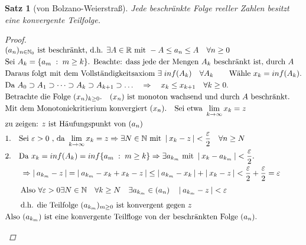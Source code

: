 \documentclass[a4paper,titlepage,oneside]{article}
\def\N{\ensuremath{\mathbb{N}} }
\def\R{\ensuremath{\mathbb{R}} }
\renewcommand{\epsilon}{\ensuremath{\varepsilon} }
\def\zz{\text{zu zeigen: }}
\def\sp{\hspace{0,1cm}}
\renewcommand{\liminf}[2][n]{\ensuremath{\lim\limits_{#1 \rightarrow \infty}{#2}}}
\newcommand{\abs}[1]{\ensuremath{\left|\:#1\:\right|}}
\newcommand{\menge}[2]{\ensuremath{\{#1\sp : \sp #2\}}}
\theoremstyle{thmstyle}
\newtheorem{satz}{Satz}[subsection]
\begin{document}
\begin{satz}[von Bolzano-Weierstraß]
Jede beschränkte Folge reeller Zahlen besitzt eine konvergente Teilfolge.
\begin{proof}
\begin{math} \displaystyle
\begin{aligned}[t]
&(a_n)_{n \in \N_0} \text{ ist beschränkt, d.h. }\exists A \in \R \text{ mit }-A \le a_n \le A \quad \forall n \ge 0\\
&\text{Sei } A_k = \menge{a_m}{m \ge k} \text{. Beachte: dass jede der Mengen } A_k \text{ beschränkt ist, durch }A\\
&\text{Daraus folgt mit dem Vollständigkeitsaxiom } \exists \sp inf(A_k) \quad \forall A_k \qquad \text{Wähle } x_k = inf(A_k). \\
&\text{Da } A_0 \supset A_1 \supset \dots \supset A_k \supset A_{k+1} \supset \dots \quad \Rightarrow \quad x_k \le x_{k+1} \quad \forall k \ge 0.\\
&\text{Betrachte die Folge }(x_n)_{k \ge 0}. \quad (x_n) \text{ ist monoton wachsend und durch $A$ beschränkt.}\\
&\text{Mit dem Monotoniekritierium konvergiert } (x_n). \quad \text{Sei etwa } \liminf[k]{x_k} = z\\
&\zz z \text{ ist Häufungspunkt von } (a_n) \\
&\begin{aligned}[t]
& 1. &&\text{Sei } \epsilon > 0 \text{ , da } \liminf[k]{x_k} = z \Rightarrow \exists N \in \N \text{ mit } \abs{x_k - z} < \frac{\epsilon}{2} \quad \forall n \ge N \\
& 2. &&\text{Da }x_k = inf(A_k) = inf\menge{a_m}{m \ge k} \Rightarrow \exists a_{k_m} \text{ mit } \abs{x_k - a_{k_m}} < \frac{\epsilon}{2}.
\end{aligned} \\ \vphantom{\frac{\epsilon}{2}}
&\qquad \Rightarrow \abs{a_{k_m} - z} = \abs{a_{k_m} - x_k + x_k - z} \le \abs{a_{k_m} - x_k} + \abs{x_k - z} < \frac{\epsilon}{2} + \frac{\epsilon}{2} = \epsilon  \\ \vphantom{\frac{\epsilon}{2}}
&\qquad \text{Also } \forall \epsilon > 0 \exists N \in \N \quad \forall k \ge N \quad \exists a_{k_m} \in (a_n) \quad \abs{a_{k_m} - z} < \epsilon  \\
&\qquad \text{d.h. die Teilfolge }(a_{k_m})_{m\ge 0}\text{ ist konvergent gegen } z \\
&\text{Also }(a_{k_m})\text{ ist eine konvergente Teilfloge von der beschränkten Folge }(a_n).
\end{aligned} \\
\end{math}
\begin{figure}[h!] \begin{center}  \end{center}\end{figure}
\end{proof}
\end{satz}
\end{document}
